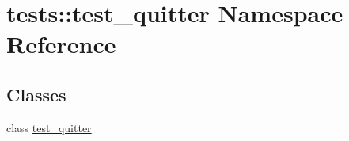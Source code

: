 \hypertarget{namespacetests_1_1test__quitter}{\section{tests\-:\-:test\-\_\-quitter \-Namespace \-Reference}
\label{namespacetests_1_1test__quitter}
}
\subsection*{\-Classes}
\begin{DoxyCompactItemize}
\item 
class \hyperlink{classtests_1_1test__quitter_1_1test__quitter}{test\-\_\-quitter}
\end{DoxyCompactItemize}
